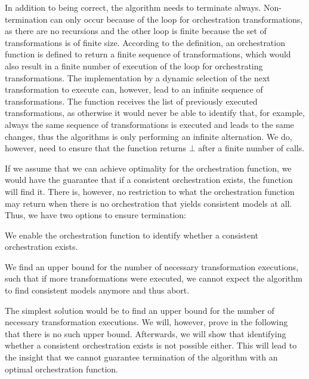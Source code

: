 In addition to being correct, the algorithm needs to terminate always.
Non-termination can only occur because of the loop for orchestration transformations, as there are no recursions and the other loop is finite because the set of transformations is of finite size.
According to the definition, an orchestration function is defined to return a finite sequence of transformations, which would also result in a finite number of execution of the loop for orchestrating transformations.
The implementation by a dynamic selection of the next transformation to execute can, however, lead to an infinite sequence of transformations.
The  function receives the list of previously executed transformations, as otherwise it would never be able to identify that, for example, always the same sequence of transformations is executed and leads to the same changes, thus the algorithms is only performing an infinite alternation.
We do, however, need to ensure that the  function returns $\bot$ after a finite number of calls.

If we assume that we can achieve optimality for the orchestration function, we would have the guarantee that if a consistent orchestration exists, the function will find it.
There is, however, no restriction to what the orchestration function may return when there is no orchestration that yields consistent models at all.
Thus, we have two options to ensure termination:
\begin{properenumerate}
    \item We enable the orchestration function to identify whether a consistent orchestration exists.
    \item We find an upper bound for the number of necessary transformation executions, such that if more transformations were executed, we cannot expect the algorithm to find consistent models anymore and thus abort. 
\end{properenumerate}

The simplest solution would be to find an upper bound for the number of necessary transformation executions.
We will, however, prove in the following that there is no such upper bound.
Afterwards, we will show that identifying whether a consistent orchestration exists is not possible either.
This will lead to the insight that we cannot guarantee termination of the algorithm with an optimal orchestration function.


